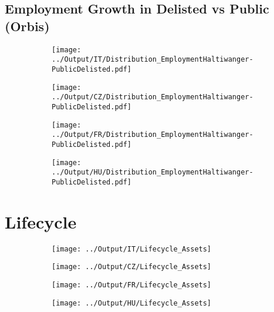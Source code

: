 \documentclass[12pt,notitlepage]{article}
\begin{document}
\subsection{Employment Growth in Delisted vs Public (Orbis)}
\begin{figure}[!htpb]
\centering
\begin{subfigure}{.49\textwidth}
    \centering
 \texttt{[image: ../Output/IT/Distribution\_EmploymentHaltiwanger-PublicDelisted.pdf]}
\end{subfigure}%
\begin{subfigure}{.49\textwidth}
    \centering
 \texttt{[image: ../Output/CZ/Distribution\_EmploymentHaltiwanger-PublicDelisted.pdf]}
\end{subfigure}
\begin{subfigure}{.49\textwidth}
    \centering
 \texttt{[image: ../Output/FR/Distribution\_EmploymentHaltiwanger-PublicDelisted.pdf]}
\end{subfigure}%
\begin{subfigure}{.49\textwidth}
    \centering
 \texttt{[image: ../Output/HU/Distribution\_EmploymentHaltiwanger-PublicDelisted.pdf]}
\end{subfigure}
\end{figure}
\pagebreak



\FloatBarrier
\section{Lifecycle} %
\label{sec:lifecycle}
\FloatBarrier




\begin{figure}[!htpb]
\centering
\caption{Firm age and Assets}
\begin{subfigure}{.49\textwidth}
    \centering
 \texttt{[image: ../Output/IT/Lifecycle\_Assets]}
\end{subfigure}%
\begin{subfigure}{.49\textwidth}
    \centering
 \texttt{[image: ../Output/CZ/Lifecycle\_Assets]}
\end{subfigure}
\begin{subfigure}{.49\textwidth}
    \centering
 \texttt{[image: ../Output/FR/Lifecycle\_Assets]}
\end{subfigure}%
\begin{subfigure}{.49\textwidth}
    \centering
 \texttt{[image: ../Output/HU/Lifecycle\_Assets]}
\end{subfigure}
\end{figure}
\pagebreak
\end{document}
